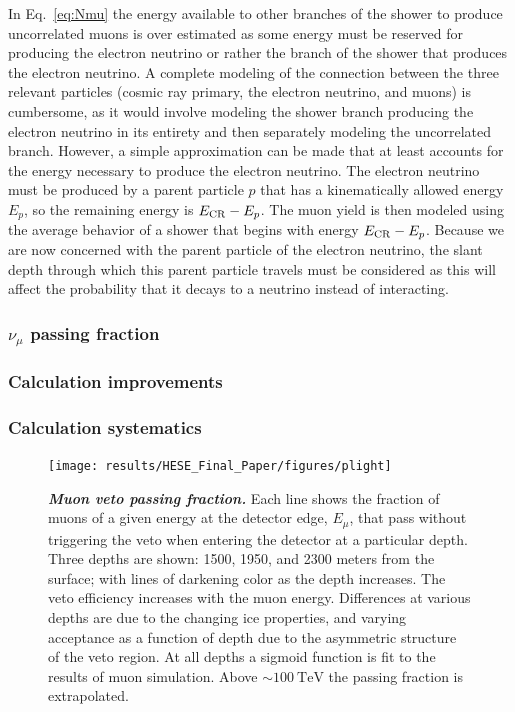 In Eq.~\ref{eq:Nmu} the energy available to other branches of the shower to produce uncorrelated muons is over estimated as some energy must be reserved for producing the electron neutrino or rather the branch of the shower that produces the electron neutrino.
A complete modeling of the connection between the three relevant particles (cosmic ray primary, the electron neutrino, and muons) is cumbersome, as it would involve modeling the shower branch producing the electron neutrino in its entirety and then separately modeling the uncorrelated branch.
However, a simple approximation can be made that at least accounts for the energy necessary to produce the electron neutrino.
The electron neutrino must be produced by a parent particle $p$ that has a kinematically allowed energy $E_p$, so the remaining energy is $E_{\rm CR}-E_p$.
The muon yield is then modeled using the average behavior of a shower that begins with energy $E_{\rm CR}-E_p$.
Because we are now concerned with the parent particle of the electron neutrino, the slant depth through which this parent particle travels must be considered as this will affect the probability that it decays to a neutrino instead of interacting.


\subsubsection{$\nu_\mu$ passing fraction}
\subsubsection{Calculation improvements}
\subsubsection{Calculation systematics}

\begin{figure}
	\centering
	\texttt{[image: results/HESE\_Final\_Paper/figures/plight]}
	\internallinenumbers
	\caption{\textbf{\textit{Muon veto passing fraction.}} Each line shows the fraction of muons of a given energy at the detector edge, $E_\mu$, that pass without triggering the veto when entering the detector at a particular depth.
		Three depths are shown: 1500, 1950, and 2300 meters from the surface; with lines of darkening color as the depth increases.
		The veto efficiency increases with the muon energy.
		Differences at various depths are due to the changing ice properties, and varying acceptance as a function of depth due to the asymmetric structure of the veto region.
		At all depths a sigmoid function is fit to the results of muon simulation.
		Above $\sim\SI{100}\TeV$ the passing fraction is extrapolated.}\label{fig:P_light}
\end{figure}

